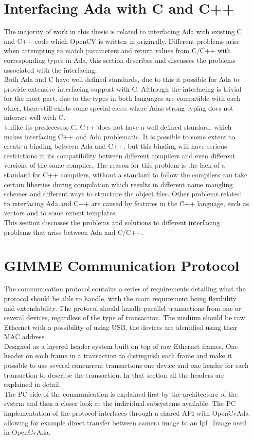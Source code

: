 \section{Interfacing Ada with C and C++}
The majority of work in this thesis is related to interfacing Ada with existing C and C++ code which OpenCV is written in originally. Different problems arise when attempting to match parameters and return values from C/C++ with corresponding types in Ada, this section describes and discusses the problems associated with the interfacing.
\\
Both Ada and C have well defined standards, due to this it possible for Ada to provide extensive interfacing support with C. Although the interfacing is trivial for the most part, due to the types in both languages are compatible with each other, there still exists some special cases where Adas strong typing does not interact well with C.
\\
Unlike its predecessor C, C++ does not have a well defined standard, which makes interfacing C++ and Ada problematic. It is possible to some extent to create a binding between Ada and C++, but this binding will have serious restrictions in its compatibility between different compilers and even different versions of the same compiler. The reason for this problem is the lack of a standard for C++ compilers, without a standard to follow the compilers can take certain liberties during compilation which results in different name mangling schemes and different ways to structure the object files. Other problems related to interfacing Ada and C++ are caused by features in the C++ language, such as vectors and to some extent templates.
\\
This section discusses the problems and solutions to different interfacing problems that arise between Ada and C/C++.
\section{GIMME Communication Protocol}
The communication protocol contains a series of requirements detailing what the protocol should be able to handle, with the main requirement being flexibility and extendability. The protocol should handle parallel transactions from one or several devices, regardless of the type of transaction. The medium should be raw Ethernet with a possibility of using USB, the devices are identified using their MAC address.
\\
Designed as a layered header system built on top of raw Ethernet frames. One header on each frame in a transaction to distinguish each frame and make it possible to use several concurrent transactions one device and one header for each transaction to describe the transaction. In that section all the headers are explained in detail.
\\
The PC side of the communication is explained first by the architecture of the system and then a closer look at the individual subsystems available. The PC implementation of the protocol interfaces through a shared API with OpenCvAda allowing for example direct transfer between camera image to an Ipl_Image used in OpenCvAda.
